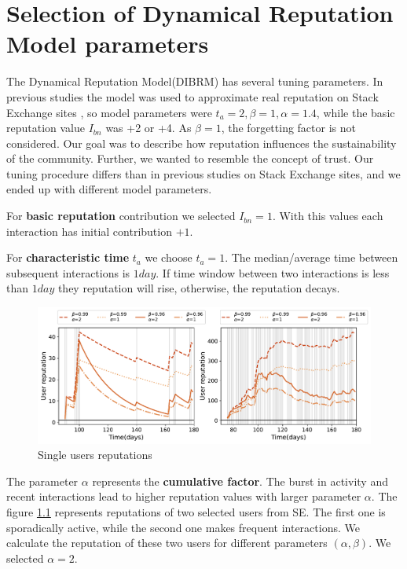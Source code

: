 \chapter{Selection of Dynamical Reputation Model parameters}
\label{App:parameters}

The Dynamical Reputation Model(DIBRM) has several tuning parameters. In previous studies the model \cite{melnikov2018toward,yashkina2020} was used to approximate real reputation on Stack Exchange sites \cite{yashkina2020}, so model parameters were $t_a =2, \beta = 1, \alpha = 1.4$, while the basic reputation value $I_{bn}$ was +2 or +4. As $\beta=1$, the forgetting factor is not considered. Our goal was to describe how reputation influences the sustainability of the community. Further, we wanted to resemble the concept of trust. Our tuning procedure differs than in previous studies on Stack Exchange sites, and we ended up with different model parameters. 

For \textbf{basic reputation} contribution we selected $I_{bn}=1$. With this values each interaction has initial contribution $+1$. 

For \textbf{characteristic time} $t_a$ we choose $t_a=1$. The median/average time between subsequent interactions is $1 day$. If time window between two interactions is less than $1 day$ they reputation will rise, otherwise, the reputation decays.

\begin{figure}[h]
	\centering
	\includegraphics[width=0.8\linewidth]{figures/stackexchange/single_user_reputation.pdf}
	\caption[Single users reputations.]{Single users reputations }
	\label{fig:singleuser}
\end{figure} 

The {parameter $\alpha$} represents the \textbf{cumulative factor}. The burst in activity and recent interactions lead to higher reputation values with larger parameter $\alpha$. The figure \ref{fig:singleuser} represents reputations of two selected users from SE. The first one is sporadically active, while the second one makes frequent interactions. We calculate the reputation of these two users for different parameters $(\alpha, \beta)$. We selected $\alpha=2$.  

